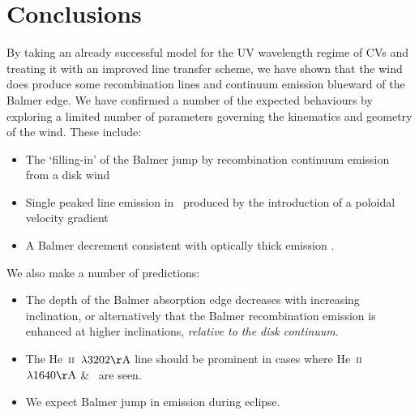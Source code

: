 \documentclass[preprint, a4paper, 11pt]{aastex}
\begin{document}
{%






%
%


\section{Conclusions}

By taking an already successful model
for the UV wavelength regime of CVs and treating 
it with an improved line transfer scheme, we have shown
that the wind does produce some recombination lines
and continuum emission blueward of the Balmer edge.
We have confirmed a number of the expected behaviours
by exploring a limited number of parameters governing the
kinematics and geometry of the wind. These include:

\renewcommand{\labelitemi}{$\bullet$}
\begin{itemize}
	\item The `filling-in' of the Balmer jump \citep{KLWB98} by recombination 
	continuum emission from a disk wind
	\item Single peaked line emission in \ha\ produced by 
	the introduction of a poloidal velocity gradient \citep{MC96}
	\item A Balmer decrement consistent with optically thick emission \citep{elitzur1983}.
\end{itemize}
\smallskip

\noindent We also make a number of predictions:

\begin{itemize}
	\item The depth of the Balmer absorption edge decreases with increasing inclination,
or alternatively that the Balmer recombination emission
is enhanced at higher inclinations, {\sl relative to the disk continuum}.
	\item The He~\textsc{ii}~$\lambda3202{\rm \AA}$ line should be
prominent in cases where He~\textsc{ii}~$\lambda1640{\rm \AA}$ \& 
\heiiopt\ are seen. 
	\item We expect Balmer jump in emission during eclipse.
\end{itemize}

}
\end{document}
